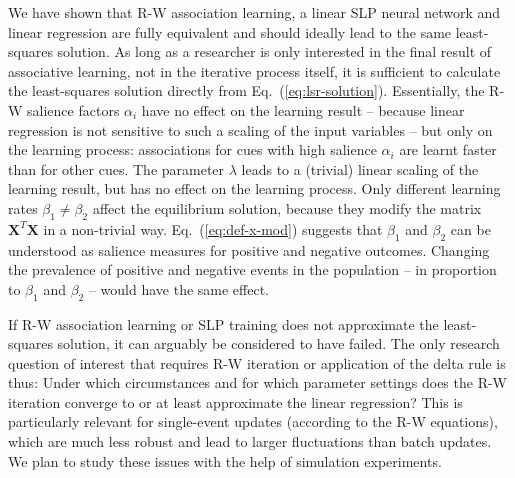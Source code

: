 \documentclass[conference]{IEEEtran}
\begin{document}
We have shown that R-W association learning, a linear SLP neural network and linear regression are fully equivalent and should ideally lead to the same least-squares solution.  As long as a researcher is only interested in the final result of associative learning, not in the iterative process itself, it is sufficient to calculate the least-squares solution directly from Eq.~(\ref{eq:lsr-solution}). Essentially, the R-W salience factors $\alpha_i$ have no effect on the learning result -- because linear regression is not sensitive to such a scaling of the input variables -- but only on the learning process: associations for cues with high salience $\alpha_i$ are learnt faster than for other cues.  The parameter $\lambda$ leads to a (trivial) linear scaling of the learning result, but has no effect on the learning process.  Only different learning rates $\beta_1\neq \beta_2$ affect the equilibrium solution, because they modify the matrix $\mathbf{X}^T \mathbf{X}$ in a non-trivial way.  Eq.~(\ref{eq:def-x-mod}) suggests that $\beta_1$ and $\beta_2$ can be understood as salience measures for positive and negative outcomes.  Changing the prevalence of positive and negative events in the population -- in proportion to $\beta_1$ and $\beta_2$ -- would have the same effect.

If R-W association learning or SLP training does not approximate the least-squares solution, it can arguably be considered to have failed.  The only research question of interest that requires R-W iteration or application of the delta rule is thus: Under which circumstances and for which parameter settings does the R-W iteration converge to or at least approximate the linear regression? This is particularly relevant for single-event updates (according to the R-W equations), which are much less robust and lead to larger fluctuations than batch updates.  We plan to study these issues with the help of simulation experiments.
\end{document}
